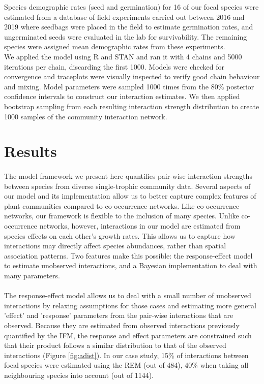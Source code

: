 \documentclass[a4,12pt]{article}
\begin{document}
        Species demographic rates (seed and germination) for 16 of our focal species were estimated from a database of field experiments carried out between 2016 and 2019 where seedbags were placed in the field to estimate germination rates, and ungerminated seeds were evaluated in the lab for survivability. The remaining species were assigned mean demographic rates from these experiments. \\

        We applied the model using R and STAN and ran it with 4 chains and 5000 iterations per chain, discarding the first 1000. Models were checked for convergence and traceplots were visually inspected to verify good chain behaviour and mixing. Model parameters were sampled 1000 times from the 80\% posterior confidence intervals to construct our interaction estimates. We then applied bootstrap sampling from each resulting interaction strength distribution to create 1000 samples of the community interaction network.


\section{Results}

    \paragraph{}
    The model framework we present here quantifies pair-wise interaction strengths between species from diverse single-trophic community data. Several aspects of our model and its implementation allow us to better capture complex features of plant communities compared to co-occurrence networks. Like co-occurrence networks, our framework is flexible to the inclusion of many species. Unlike co-occurrence networks, however, interactions in our model are estimated from species effects on each other's growth rates.  This allows us to capture how interactions may directly affect species abundances, rather than spatial association patterns. Two features make this possible: the response-effect model to estimate unobserved interactions, and a Bayesian implementation to deal with many parameters. 

    \paragraph{}
    The response-effect model allows us to deal with a small number of unobserved interactions by relaxing assumptions for those cases and estimating more general 'effect' and 'response' parameters from the pair-wise interactions that are observed. Because they are estimated from observed interactions previously quantified by the IFM, the response and effect parameters are constrained such that their product follows a similar distribution to that of the observed interactions (Figure \ref{fig:adist}). In our case study, 15\% of interactions between focal species were estimated using the REM (out of 484), 40\% when taking all neighbouring species into account (out of 1144). 
\end{document}
